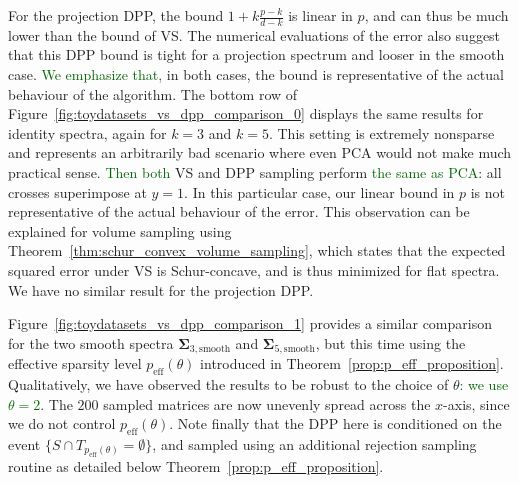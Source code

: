 \documentclass[twoside,11pt]{book}
\newcommand{\rev}[1]{\textcolor{darkgreen}{#1}}
\numberwithin{theorem}{chapter}
\numberwithin{definition}{chapter}
\numberwithin{proposition}{chapter}
\numberwithin{corollary}{chapter}
\numberwithin{example}{chapter}
\numberwithin{lemma}{chapter}
\DeclareMathOperator{\eff}{\mathrm{eff}}
\begin{document}
For the projection DPP, the bound $1+k\frac{p-k}{d-k}$ is linear in $p$, and can thus be much lower than the bound of VS. The numerical evaluations of the error also suggest that this DPP bound is tight for a projection spectrum and looser in the smooth case. \rev{We emphasize that,} in both cases, the bound is representative of the actual behaviour of the algorithm.
The bottom row of Figure~\ref{fig:toydatasets_vs_dpp_comparison_0} displays the same results for identity spectra, again for $k=3$ and $k=5$. This setting is extremely nonsparse and represents an arbitrarily bad scenario where even PCA would not make much practical sense. \rev{Then both} VS and DPP sampling perform \rev{the same as PCA}: all crosses superimpose at $y=1$. In this particular case, our linear bound in $p$ is not representative of the actual behaviour of the error. This observation can be explained for volume sampling using Theorem~\ref{thm:schur_convex_volume_sampling}, which states that the expected squared error under VS is Schur-concave, and is thus minimized for flat spectra. We have no similar result for the projection DPP.

Figure~\ref{fig:toydatasets_vs_dpp_comparison_1} provides a similar comparison for the two smooth spectra $\bm{\Sigma}_{3,\text{smooth}}$ and $\bm{\Sigma}_{5,\text{smooth}}$, but this time using the effective sparsity level $p_{\eff}(\theta)$ introduced in Theorem~\ref{prop:p_eff_proposition}. Qualitatively, we have observed the results to be robust to the choice of $\theta$\rev{: we use $\theta=2$}. The $200$ sampled matrices are now unevenly spread across the $x$-axis, since we do not control $p_{\eff}(\theta)$. Note finally that the DPP here is conditioned on the event $\{S \cap T_{p_{\mathrm{eff}}(\theta)}=\emptyset\}$, and sampled using an additional rejection sampling routine as detailed below Theorem~\ref{prop:p_eff_proposition}.
\end{document}
